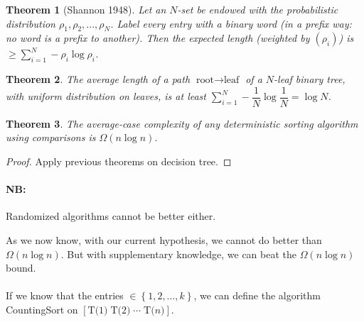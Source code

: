 \documentclass[11pt,a4paper]{article}
\newtheorem{theorem}{Theorem}
\begin{document}
\begin{theorem}[Shannon 1948]
Let an $N$-set be endowed with the probabilistic distribution $\rho_1, \rho_2,..., \rho_N$. Label every entry with a binary word (in a prefix way: no word is a prefix to another). Then the expected length (weighted by $(\rho_i)$) is $\geq \sum_{i=1}^{N} -\rho_i \log \rho_i$. 
\end{theorem}
\begin{theorem}
The average length of a path $\text{root} \rightarrow \text{leaf}$ of a $N$-leaf binary tree, with uniform distribution on leaves, is at least $\sum_{i=1}^N -\dfrac{1}{N} \log \dfrac{1}{N} = \log N$.
\end{theorem}
\begin{theorem}
The average-case complexity of \emph{any} deterministic sorting algorithm using comparisons is $\Omega (n\log n)$.
\end{theorem}
\begin{proof}
Apply previous theorems on decision tree.
\end{proof}

\paragraph*{NB:} Randomized algorithms cannot be better either.

As we now know, with our current hypothesis, we cannot do better than $\Omega (n\log n)$. But with supplementary knowledge, we can beat the $\Omega (n\log n)$ bound.
\\ \\
If we know that the entries $\in \left\{ 1,2,...,k \right\}$, we can define the algorithm CountingSort on $\left[ \text{T(1)} \; \text{T(2)} \; \cdots \; \text{T(}n\text{)} \right]$.
\end{document}
